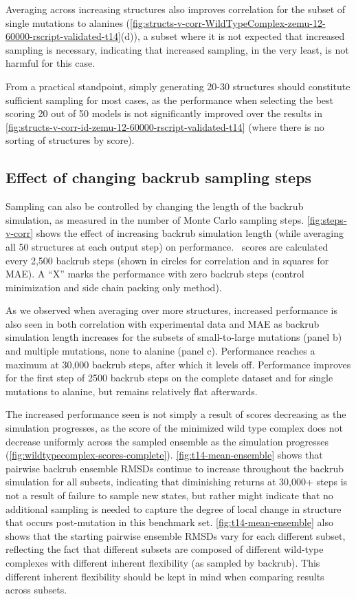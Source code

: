 Averaging across increasing structures also improves correlation for the subset of single mutations to alanines (\cref{fig:structs-v-corr-WildTypeComplex-zemu-12-60000-rscript-validated-t14}(d)), a subset where it is not expected that increased sampling is necessary, indicating that increased sampling, in the very least, is not harmful for this case.

From a practical standpoint, simply generating 20-30 structures should constitute sufficient sampling for most cases, as the performance when selecting the best scoring 20 out of 50 models is not significantly improved over the results in \cref{fig:structs-v-corr-id-zemu-12-60000-rscript-validated-t14} (where there is no sorting of structures by score).

\subsection{Effect of changing backrub sampling steps}

Sampling can also be controlled by changing the length of the backrub simulation, as measured in the number of Monte Carlo sampling steps.
\cref{fig:steps-v-corr} shows the effect of increasing backrub simulation length (while averaging all 50 structures at each output step) on performance.
\ddg\ scores are calculated every 2,500 backrub steps (shown in circles for correlation and in squares for MAE).
A ``X'' marks the performance with zero backrub steps (control minimization and side chain packing only method).

As we observed when averaging over more structures, increased performance is also seen in both correlation with experimental data and MAE as backrub simulation length increases for the subsets of small-to-large mutations (panel b) and multiple mutations, none to alanine (panel c).
Performance reaches a maximum at 30,000 backrub steps, after which it levels off.
Performance improves for the first step of 2500 backrub steps on the complete dataset and for single mutations to alanine, but remains relatively flat afterwards.

The increased performance seen is not simply a result of scores decreasing as the simulation progresses, as the score of the minimized wild type complex does not decrease uniformly across the sampled ensemble as the simulation progresses (\cref{fig:wildtypecomplex-scores-complete}).
\cref{fig:t14-mean-ensemble} shows that pairwise backrub ensemble RMSDs continue to increase throughout the backrub simulation for all subsets, indicating that diminishing returns at 30,000+ steps is not a result of failure to sample new states, but rather might indicate that no additional sampling is needed to capture the degree of local change in structure that occurs post-mutation in this benchmark set.
\cref{fig:t14-mean-ensemble} also shows that the starting pairwise ensemble RMSDs vary for each different subset, reflecting the fact that different subsets are composed of different wild-type complexes with different inherent flexibility (as sampled by backrub).
This different inherent flexibility should be kept in mind when comparing results across subsets.

